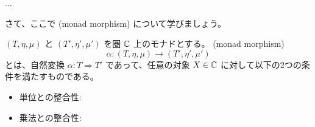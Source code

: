\documentclass[
		head_space=20mm,
		foot_space=20mm,
		gutter=10mm,
		line_length=190mm
]{jlreq}
\begin{document}
\begin{theorem}
	... 
\end{theorem}

\clearpage

さて、ここで (monad morphism) について学びましょう。

\begin{definition}[モナド射]
	$(T,\eta,\mu)$ と $(T',\eta',\mu')$ を圏 $\mathbb{C}$ 上のモナドとする。 (monad morphism) \[\alpha:(T,\eta,\mu)\to(T',\eta',\mu')\] とは、自然変換 $\alpha:T\Rightarrow T'$ 
	であって、任意の対象 $X\in\mathbb{C}$ に対して以下の2つの条件を満たすものである。
	\begin{itemize}
		\item 単位との整合性: 
		\begin{center}
		\end{center}
		\item 乗法との整合性: 
		\begin{center}
		\end{center}
	\end{itemize}
\end{definition}
\end{document}
